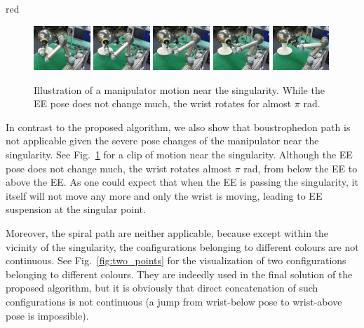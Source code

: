 \documentclass[Afour,sageh,times]{sagej}
\begin{document}
\begin{color}{red}
\begin{figure}[t]
\centering
\includegraphics[width = 0.19\textwidth]{figures/real_world/show_huge_change/pose_1}
\includegraphics[width = 0.19\textwidth]{figures/real_world/show_huge_change/pose_2}
\includegraphics[width = 0.19\textwidth]{figures/real_world/show_huge_change/pose_3}
\includegraphics[width = 0.19\textwidth]{figures/real_world/show_huge_change/pose_4}
\includegraphics[width = 0.19\textwidth]{figures/real_world/show_huge_change/pose_5}
\caption{Illustration of a manipulator motion near the singularity. While the EE pose does not change much, the wrist rotates for almost $\pi$ rad. }\label{fig:boust}
\end{figure}

In contrast to the proposed algorithm, we also show that boustrophedon path is not applicable given the severe pose changes of the manipulator near the singularity. See Fig.~\ref{fig:boust} for a clip of motion near the singularity. Although the EE pose does not change much, the wrist rotates almost $\pi$ rad, from below the EE to above the EE. As one could expect that when the EE is passing the singularity, it itself will not move any more and only the wrist is moving, leading to EE suspension at the singular point. 

Moreover, the spiral path are neither applicable, because except within the vicinity of the singularity, the configurations belonging to different colours are not continuous. See Fig.~\ref{fig:two_points} for the visualization of two configurations belonging to different colours. They are indeedly used in the final solution of the proposed algorithm, but it is obviously that direct concatenation of such configurations is not continuous (a jump from wrist-below pose to wrist-above pose is impossible). 


\end{color}
\end{document}

